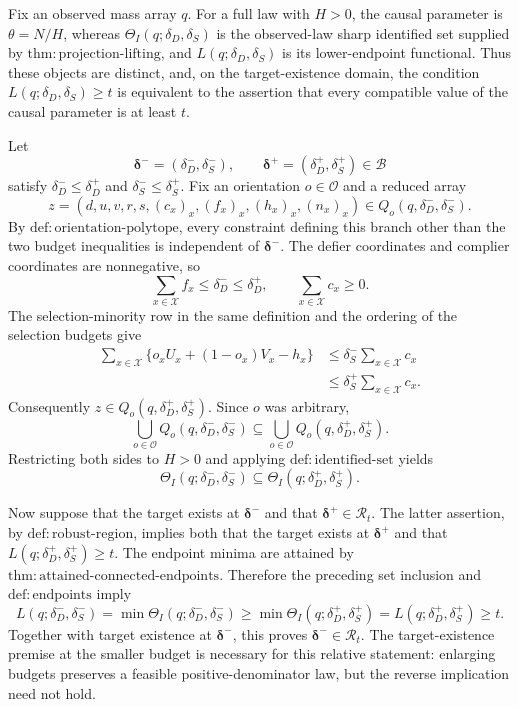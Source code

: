 Fix an observed mass array \(q\).  For a full law with \(H>0\), the causal parameter is \(\theta=N/H\), whereas \(\Theta_I(q;\delta_D,\delta_S)\) is the observed-law sharp identified set supplied by \(\mathrm{thm:projection\text{-}lifting}\), and \(L(q;\delta_D,\delta_S)\) is its lower-endpoint functional.  Thus these objects are distinct, and, on the target-existence domain, the condition \(L(q;\delta_D,\delta_S)\ge t\) is equivalent to the assertion that every compatible value of the causal parameter is at least \(t\).

Let
\[
 \boldsymbol\delta^-=(\delta_D^-,\delta_S^-),\qquad
 \boldsymbol\delta^+=(\delta_D^+,\delta_S^+)\in\mathcal B
\]
satisfy \(\delta_D^-\leq\delta_D^+\) and \(\delta_S^-\leq\delta_S^+\).  Fix an orientation \(o\in\mathcal O\) and a reduced array
\[
 z=(d,u,v,r,s,(c_x)_x,(f_x)_x,(h_x)_x,(n_x)_x)
 \in Q_o(q,\delta_D^-,\delta_S^-).
\]
By \(\mathrm{def:orientation\text{-}polytope}\), every constraint defining this branch other than the two budget inequalities is independent of \(\boldsymbol\delta^-\).  The defier coordinates and complier coordinates are nonnegative, so
\[
 \sum_{x\in\mathcal X} f_x
 \leq \delta_D^-
 \leq \delta_D^+,
 \qquad
 \sum_{x\in\mathcal X}c_x\geq0.
\]
The selection-minority row in the same definition and the ordering of the selection budgets give
\[
 \begin{aligned}
 \sum_{x\in\mathcal X}
 \bigl\{o_xU_x+(1-o_x)V_x-h_x\bigr\}
 &\leq \delta_S^-\sum_{x\in\mathcal X}c_x \\
 &\leq \delta_S^+\sum_{x\in\mathcal X}c_x.
 \end{aligned}
\]
Consequently \(z\in Q_o(q,\delta_D^+,\delta_S^+)\).  Since \(o\) was arbitrary,
\[
 \bigcup_{o\in\mathcal O}Q_o(q,\delta_D^-,\delta_S^-)
 \subseteq
 \bigcup_{o\in\mathcal O}Q_o(q,\delta_D^+,\delta_S^+).
\]
Restricting both sides to \(H>0\) and applying \(\mathrm{def:identified\text{-}set}\) yields
\[
 \Theta_I(q;\delta_D^-,\delta_S^-)
 \subseteq
 \Theta_I(q;\delta_D^+,\delta_S^+).
\]

Now suppose that the target exists at \(\boldsymbol\delta^-\) and that \(\boldsymbol\delta^+\in\mathcal R_t\).  The latter assertion, by \(\mathrm{def:robust\text{-}region}\), implies both that the target exists at \(\boldsymbol\delta^+\) and that \(L(q;\delta_D^+,\delta_S^+)\geq t\).  The endpoint minima are attained by \(\mathrm{thm:attained\text{-}connected\text{-}endpoints}\).  Therefore the preceding set inclusion and \(\mathrm{def:endpoints}\) imply
\[
 L(q;\delta_D^-,\delta_S^-)
 =\min\Theta_I(q;\delta_D^-,\delta_S^-)
 \geq
 \min\Theta_I(q;\delta_D^+,\delta_S^+)
 =L(q;\delta_D^+,\delta_S^+)
 \geq t.
\]
Together with target existence at \(\boldsymbol\delta^-\), this proves \(\boldsymbol\delta^-\in\mathcal R_t\).  The target-existence premise at the smaller budget is necessary for this relative statement: enlarging budgets preserves a feasible positive-denominator law, but the reverse implication need not hold.

